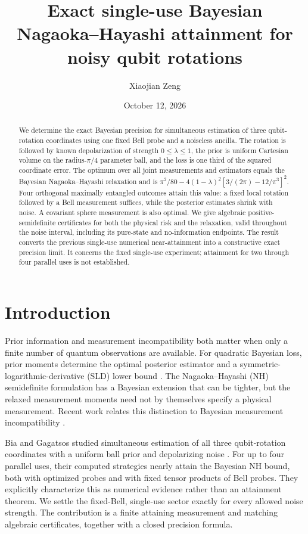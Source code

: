 \documentclass[aps,pra,reprint,amsmath,amssymb,nofootinbib,longbibliography,floatfix]{revtex4-2}
\begin{document}
\title{Exact single-use Bayesian Nagaoka--Hayashi attainment for noisy qubit rotations}
\author{Xiaojian Zeng}
\date{October 12, 2026}
\begin{abstract}
We determine the exact Bayesian precision for simultaneous estimation of
three qubit-rotation coordinates using one fixed Bell probe and a noiseless
ancilla. The rotation is followed by known depolarization of strength
$0\leq\lambda\leq1$, the prior is uniform Cartesian volume on the
radius-$\pi/4$ parameter ball, and the loss is one third of the squared
coordinate error. The optimum over all joint measurements and estimators
equals the Bayesian Nagaoka--Hayashi relaxation and is
$\pi^2/80-4(1-\lambda)^2[3/(2\pi)-12/\pi^3]^2$.
Four orthogonal maximally entangled outcomes attain this value: a fixed
local rotation followed by a Bell measurement suffices, while the posterior
estimates shrink with noise. A covariant sphere measurement is also optimal.
We give algebraic positive-semidefinite certificates for both the physical
risk and the relaxation, valid throughout the noise interval, including
its pure-state and no-information endpoints. The result converts the
previous single-use numerical near-attainment into a constructive exact
precision limit. It concerns the fixed single-use experiment; attainment
for two through four parallel uses is not established.
\end{abstract}
\maketitle

\section{Introduction}
Prior information and measurement incompatibility both matter when only
a finite number of quantum observations are available. For quadratic
Bayesian loss, prior moments determine the optimal posterior estimator
and a symmetric-logarithmic-derivative (SLD) lower bound
\cite{Rubio2020}. The Nagaoka--Hayashi (NH) semidefinite formulation
\cite{Conlon2021} has a Bayesian extension \cite{Suzuki2024} that can be
tighter, but the relaxed measurement moments need not by themselves
specify a physical measurement. Recent work relates this distinction to
Bayesian measurement incompatibility \cite{Albarelli2026}.

Bia and Gagatsos studied simultaneous estimation of all three qubit-rotation
coordinates with a uniform ball prior and depolarizing noise
\cite{Bia2026}. For up to four parallel uses, their computed strategies
nearly attain the Bayesian NH bound, both with optimized probes and with
fixed tensor products of Bell probes. They explicitly characterize this
as numerical evidence rather than an attainment theorem. We settle the
fixed-Bell, single-use sector exactly for every allowed noise strength.
The contribution is a finite attaining measurement and matching algebraic
certificates, together with a closed precision formula.
\end{document}
